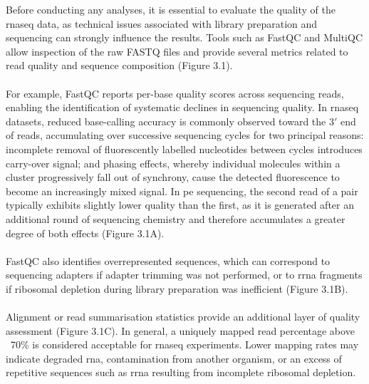 Before conducting any analyses, it is essential to evaluate the quality of the \gls{rnaseq} data, as technical issues associated with library preparation and sequencing can strongly influence the results. Tools such as FastQC\cite{andrews_fastqc_2010} and MultiQC\cite{ewels_multiqc_2016} allow inspection of the raw FASTQ files and provide several metrics related to read quality and sequence composition (Figure 3.1). 
\\
\\
For example, FastQC reports per-base quality scores across sequencing reads, enabling the identification of systematic declines in sequencing quality\cite{andrews_fastqc_2010}. In \gls{rnaseq} datasets, reduced base-calling accuracy is commonly observed toward the 3$'$ end of reads, accumulating over successive sequencing cycles for two principal reasons: incomplete removal of fluorescently labelled nucleotides between cycles introduces carry-over signal; and phasing effects, whereby individual molecules within a cluster progressively fall out of synchrony, cause the detected fluorescence to become an increasingly mixed signal. In \gls{pe} sequencing, the second read of a pair typically exhibits slightly lower quality than the first, as it is generated after an additional round of sequencing chemistry and therefore accumulates a greater degree of both effects (Figure 3.1A).
\\
\\
FastQC also identifies overrepresented sequences, which can correspond to sequencing adapters if adapter trimming was not performed, or to \gls{rrna} fragments if ribosomal depletion during library preparation was inefficient\cite{andrews_fastqc_2010} (Figure 3.1B). 
\\
\\
Alignment or read summarisation statistics provide an additional layer of quality assessment (Figure 3.1C). In general, a uniquely mapped read percentage above ~70\% is considered acceptable for \gls{rnaseq} experiments\cite{peter_fitzgerald_introduction_2024}. Lower mapping rates may indicate degraded \gls{rna}, contamination from another organism, or an excess of repetitive sequences such as \gls{rrna} resulting from incomplete ribosomal depletion. 
